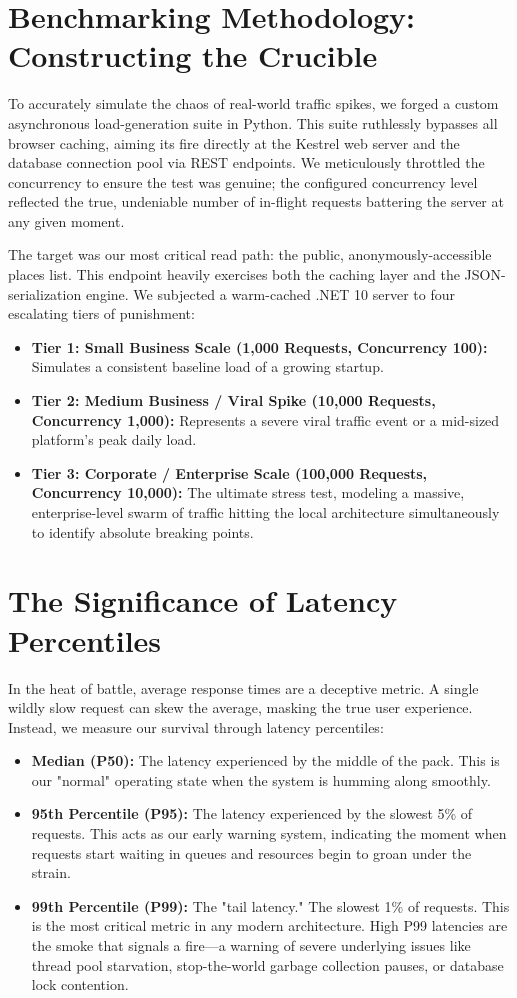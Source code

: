 \section{Benchmarking Methodology: Constructing the Crucible}
To accurately simulate the chaos of real-world traffic spikes, we forged a custom asynchronous load-generation suite in Python. This suite ruthlessly bypasses all browser caching, aiming its fire directly at the Kestrel web server and the database connection pool via REST endpoints. We meticulously throttled the concurrency to ensure the test was genuine; the configured concurrency level reflected the true, undeniable number of in-flight requests battering the server at any given moment.

The target was our most critical read path: the public, anonymously-accessible places list. This endpoint heavily exercises both the caching layer and the JSON-serialization engine. We subjected a warm-cached .NET 10 server to four escalating tiers of punishment:
\begin{itemize}
    \item \textbf{Tier 1: Small Business Scale (1,000 Requests, Concurrency 100):} Simulates a consistent baseline load of a growing startup.
    \item \textbf{Tier 2: Medium Business / Viral Spike (10,000 Requests, Concurrency 1,000):} Represents a severe viral traffic event or a mid-sized platform's peak daily load.
    \item \textbf{Tier 3: Corporate / Enterprise Scale (100,000 Requests, Concurrency 10,000):} The ultimate stress test, modeling a massive, enterprise-level swarm of traffic hitting the local architecture simultaneously to identify absolute breaking points.
\end{itemize}

\section{The Significance of Latency Percentiles}
In the heat of battle, average response times are a deceptive metric. A single wildly slow request can skew the average, masking the true user experience. Instead, we measure our survival through latency percentiles:
\begin{itemize}
    \item \textbf{Median (P50):} The latency experienced by the middle of the pack. This is our "normal" operating state when the system is humming along smoothly.
    \item \textbf{95th Percentile (P95):} The latency experienced by the slowest 5\% of requests. This acts as our early warning system, indicating the moment when requests start waiting in queues and resources begin to groan under the strain.
    \item \textbf{99th Percentile (P99):} The "tail latency." The slowest 1\% of requests. This is the most critical metric in any modern architecture. High P99 latencies are the smoke that signals a fire—a warning of severe underlying issues like thread pool starvation, stop-the-world garbage collection pauses, or database lock contention.
\end{itemize}

